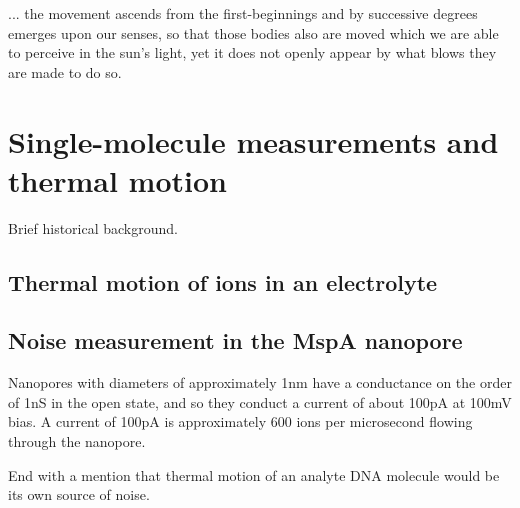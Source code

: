 \begin{savequote}[75mm]
... the movement ascends from the first-beginnings and by successive degrees emerges upon our senses, so that those bodies also are moved which we are able to perceive in the sun's light, yet it does not openly appear by what blows they are made to do so.
\end{savequote}

\chapter{Single-molecule measurements and thermal motion}
\label{thermal_motion}

Brief historical background.

\section{Thermal motion of ions in an electrolyte}

\section{Noise measurement in the MspA nanopore}

Nanopores with diameters of approximately 1nm have a conductance on the order of 1nS in the open state, and so they conduct a current of about 100pA at 100mV bias.  A current of 100pA is approximately 600 ions per microsecond flowing through the nanopore.

End with a mention that thermal motion of an analyte DNA molecule would be its own source of noise.